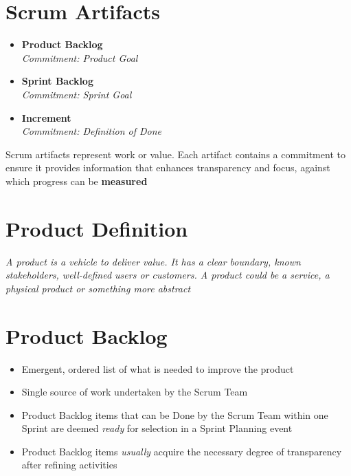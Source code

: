 \documentclass[a4paper,11pt,twocolumn]{article}
\begin{document}
\section*{Scrum Artifacts}
\begin{itemize}
	\item \textbf{Product Backlog}\\
	\textit{Commitment: Product Goal}
	\item \textbf{Sprint Backlog}\\
	\textit{Commitment: Sprint Goal}
	\item \textbf{Increment}\\
	\textit{Commitment: Definition of Done}
\end{itemize}

\begin{tcolorbox}[colback=black!8!white,colframe=gray!50!black,title=Note,sharp corners,fonttitle=\normalsize\bfseries,fontupper=\normalsize,left=0.7em,right=0.7em]
	Scrum artifacts represent work or value. Each artifact contains a commitment to ensure it provides information that enhances transparency and focus, against which progress can be \textbf{measured}
\end{tcolorbox}

\section*{Product Definition}
\textit{A product is a vehicle to deliver value. It has a clear boundary, known stakeholders, well-defined users or customers. A product could be a service, a physical product or something more abstract}

\section*{Product Backlog}
\begin{itemize}
	\item Emergent, ordered list of what is needed to improve the product
	\item Single source of work undertaken by the Scrum Team
	\item Product Backlog items that can be Done by the Scrum Team within one Sprint are deemed \textit{ready} for selection in a Sprint Planning event
	\item Product Backlog items \textit{usually} acquire the necessary degree of transparency after refining activities
\end{itemize}
\end{document}
